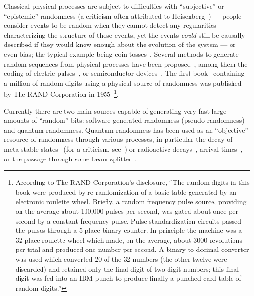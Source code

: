 \documentclass[10pt]{article}%
\begin{document}
Classical physical processes are subject to difficulties with ``subjective''  or ``epistemic'' randomness
(a criticism often attributed to Heisenberg~\cite{zeil-05_nature_ofQuantum})
---
people consider events to be random when they cannot detect
any regularities characterizing the structure of those events,
yet the events {\em could} still be causally described if they
would  know enough about the evolution of the system
---
or even bias; the typical example being coin tosses~\cite{diaconis:211}.
Several methods to generate random sequences from physical processes have been proposed~\cite{csw:prg},
among them the coding of electric pulses~\cite{0022-3735-3-8-303},
or semiconductor devices~\cite{Agnew-87,Aware,Araneus,comscire,LavaRnd,dynes:031109,Ma:05,stipcevic045104,Wayne-09}.
The first book~\cite{rand-55} containing a  million  of random digits  using a physical source of randomness
was published by The RAND Corporation in  1955~\footnote{According to The RAND Corporation's disclosure,
``The random digits in this book were produced by re-randomization of a basic table generated
by an electronic roulette wheel. Briefly, a random frequency pulse source,
providing on the average about 100,000 pulses per second, was gated about once
per second by a constant frequency pulse. Pulse standardization circuits passed
the pulses through a 5-place binary counter. In principle the machine was a 32-place
roulette wheel which made, on the average, about 3000 revolutions per trial and produced
one number per second. A binary-to-decimal converter was used which converted 20 of the 32 numbers
(the other twelve were discarded) and retained only the final digit of two-digit numbers;
this final digit was fed into an IBM punch to produce finally a punched card table of random digits.''
}.





Currently there are two main sources capable of generating very fast large amounts of  ``random''
bits: software-generated randomness
(pseudo-randomness) and quantum randomness. Quantum randomness has been used as an ``objective'' resource of randomness
through various processes, in particular the decay of meta-stable states~\cite{PhysRevLett.54.1023,er-put:85,erber-95}
(for a criticism, see~\cite{knight-86}) or radioactive decays~\cite{schmidt:462,walker-hotbits},
arrival times~\cite{stipcevic4442,stipcevic045104,dynes:031109,Ma:05,Wayne-09},
or the passage through some beam splitter~\cite{svozil-qct,rarity-94,zeilinger:qct,stefanov-2000,0256-307X-21-10-027,wang:056107,fiorentino:032334,svozil-2009-howto,Kwon:09}.
\end{document}
